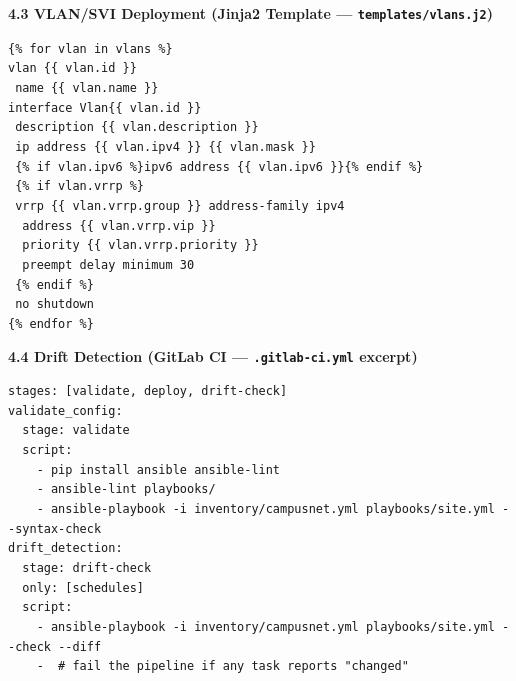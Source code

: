 \documentclass[11pt]{article}
\begin{document}
\begin{exoresolu}
\medskip
\textbf{4.3 VLAN/SVI Deployment (Jinja2 Template — \texttt{templates/vlans.j2})}\par
\texttt{\{\% for vlan in vlans \%\}}\\
\texttt{vlan \{\{ vlan.id \}\}}\\
\texttt{\ name \{\{ vlan.name \}\}}\\
\texttt{interface Vlan\{\{ vlan.id \}\}}\\
\texttt{\ description \{\{ vlan.description \}\}}\\
\texttt{\ ip address \{\{ vlan.ipv4 \}\} \{\{ vlan.mask \}\}}\\
\texttt{\ \{\% if vlan.ipv6 \%\}ipv6 address \{\{ vlan.ipv6 \}\}\{\% endif \%\}}\\
\texttt{\ \{\% if vlan.vrrp \%\}}\\
\texttt{\ vrrp \{\{ vlan.vrrp.group \}\} address-family ipv4}\\
\texttt{\ \ address \{\{ vlan.vrrp.vip \}\}}\\
\texttt{\ \ priority \{\{ vlan.vrrp.priority \}\}}\\
\texttt{\ \ preempt delay minimum 30}\\
\texttt{\ \{\% endif \%\}}\\
\texttt{\ no shutdown}\\
\texttt{\{\% endfor \%\}}

\medskip
\textbf{4.4 Drift Detection (GitLab CI — \texttt{.gitlab-ci.yml} excerpt)}\par
\texttt{stages: [validate, deploy, drift-check]}\\
\texttt{validate\_config:}\\
\texttt{\ \ stage: validate}\\
\texttt{\ \ script:}\\
\texttt{\ \ \ \ - pip install ansible ansible-lint}\\
\texttt{\ \ \ \ - ansible-lint playbooks/}\\
\texttt{\ \ \ \ - ansible-playbook -i inventory/campusnet.yml playbooks/site.yml {-}{-}syntax-check}\\
\texttt{drift\_detection:}\\
\texttt{\ \ stage: drift-check}\\
\texttt{\ \ only: [schedules]}\\
\texttt{\ \ script:}\\
\texttt{\ \ \ \ - ansible-playbook -i inventory/campusnet.yml playbooks/site.yml {-}{-}check {-}{-}diff}\\
\texttt{\ \ \ \ - \ \# fail the pipeline if any task reports "changed"}
\end{exoresolu}
\end{document}
